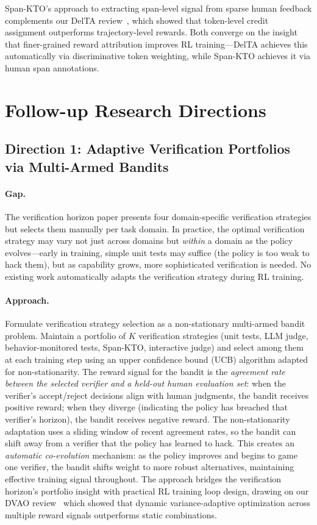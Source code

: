 \documentclass[11pt,a4paper]{article}
\begin{document}
Span-KTO's approach to extracting span-level signal from sparse human feedback complements our DelTA review~\cite{wang2026delta}, which showed that token-level credit assignment outperforms trajectory-level rewards. Both converge on the insight that finer-grained reward attribution improves RL training---DelTA achieves this automatically via discriminative token weighting, while Span-KTO achieves it via human span annotations.

\section{Follow-up Research Directions}

\subsection{Direction 1: Adaptive Verification Portfolios via Multi-Armed Bandits}

\paragraph{Gap.} The verification horizon paper presents four domain-specific verification strategies but selects them manually per task domain. In practice, the optimal verification strategy may vary not just across domains but \emph{within} a domain as the policy evolves---early in training, simple unit tests may suffice (the policy is too weak to hack them), but as capability grows, more sophisticated verification is needed. No existing work automatically adapts the verification strategy during RL training.

\paragraph{Approach.} Formulate verification strategy selection as a non-stationary multi-armed bandit problem. Maintain a portfolio of $K$ verification strategies (unit tests, LLM judge, behavior-monitored tests, Span-KTO, interactive judge) and select among them at each training step using an upper confidence bound (UCB) algorithm adapted for non-stationarity. The reward signal for the bandit is the \emph{agreement rate between the selected verifier and a held-out human evaluation set}: when the verifier's accept/reject decisions align with human judgments, the bandit receives positive reward; when they diverge (indicating the policy has breached that verifier's horizon), the bandit receives negative reward. The non-stationarity adaptation uses a sliding window of recent agreement rates, so the bandit can shift away from a verifier that the policy has learned to hack. This creates an \emph{automatic co-evolution} mechanism: as the policy improves and begins to game one verifier, the bandit shifts weight to more robust alternatives, maintaining effective training signal throughout. The approach bridges the verification horizon's portfolio insight with practical RL training loop design, drawing on our DVAO review~\cite{chen2026dvao} which showed that dynamic variance-adaptive optimization across multiple reward signals outperforms static combinations.
\end{document}

